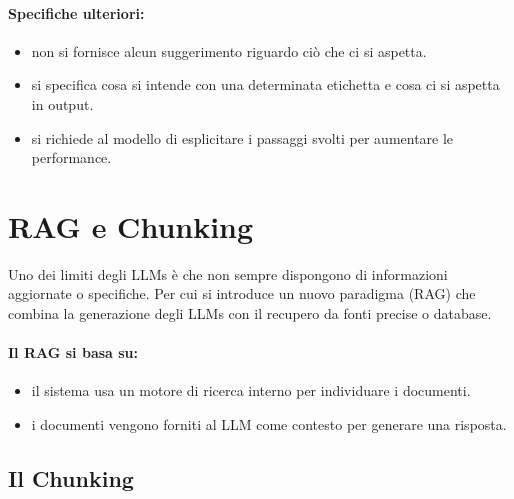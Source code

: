 
\paragraph{Specifiche ulteriori:}

\begin{itemize}
  \item {} non si fornisce alcun suggerimento riguardo ciò che ci si aspetta. 
  \item {} si specifica cosa si intende con una determinata etichetta e cosa ci si aspetta in output. 
  \item {} si richiede al modello di esplicitare i passaggi svolti per aumentare le performance.
\end{itemize}

\section{RAG e Chunking}

Uno dei limiti degli LLMs è che non sempre dispongono di informazioni aggiornate o specifiche. Per cui si introduce un nuovo paradigma  (RAG) che combina la generazione degli LLMs con il recupero da fonti precise o database.


\paragraph{Il RAG si basa su:}

\begin{itemize}
  \item {} il sistema usa un motore di ricerca interno per individuare i documenti. 
  \item {} i documenti vengono forniti al LLM come contesto per generare una risposta.
\end{itemize}

\subsection{Il Chunking}



